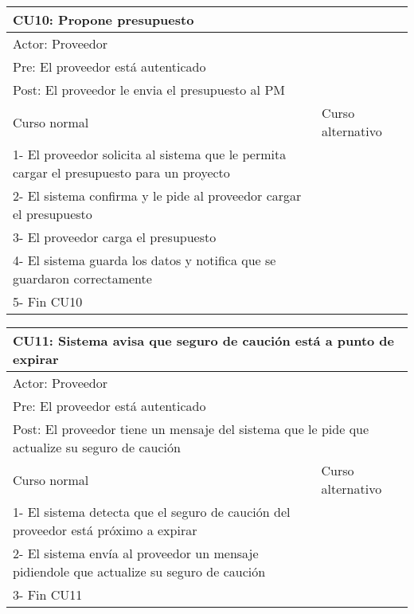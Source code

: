 \begin{table}[H]
  \begin{adjustbox}{max width = \textwidth}
  \begin{tabular}{|l|l|}
    \hline
    \multicolumn{2}{|l|}{CU10: Propone presupuesto} \\\hline
    \multicolumn{2}{|l|}{Actor: Proveedor} \\\hline
    \multicolumn{2}{|l|}{Pre: El proveedor está autenticado} \\\hline
    \multicolumn{2}{|l|}{Post: El proveedor le envia el presupuesto al PM} \\\hline
     Curso normal & Curso alternativo\\ \hline
     1- El proveedor solicita al sistema que le permita cargar el presupuesto para un proyecto & \\ \hline
     2- El sistema confirma y le pide al proveedor cargar el presupuesto & \\ \hline
     3- El proveedor carga el presupuesto &\\ \hline
     4- El sistema guarda los datos y notifica que se guardaron correctamente & \\ \hline
     5- Fin CU10 & \\ \hline
  \end{tabular}
  \end{adjustbox}
\end{table}

\begin{table}[H]
  \begin{adjustbox}{max width = \textwidth}
  \begin{tabular}{|l|l|}
    \hline
    \multicolumn{2}{|l|}{CU11: Sistema avisa que seguro de caución está a punto de expirar} \\\hline
    \multicolumn{2}{|l|}{Actor: Proveedor} \\\hline
    \multicolumn{2}{|l|}{Pre: El proveedor está autenticado} \\\hline
    \multicolumn{2}{|l|}{Post: El proveedor tiene un mensaje del sistema que le pide que actualize su seguro de caución} \\\hline
     Curso normal & Curso alternativo\\ \hline
     1- El sistema detecta que el seguro de caución del proveedor está próximo a expirar & \\ \hline
     2- El sistema envía al proveedor un mensaje pidiendole que actualize su seguro de caución & \\ \hline
     3- Fin CU11 & \\ \hline
  \end{tabular}
  \end{adjustbox}
\end{table}


